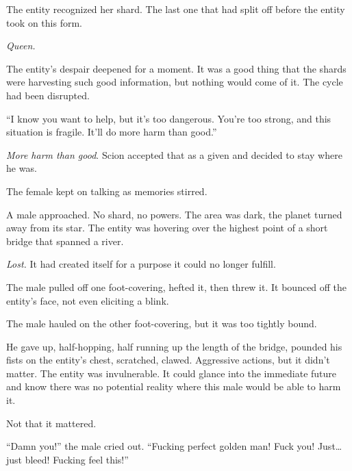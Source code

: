 The entity recognized her shard.  The last one that had split off before the entity took on this form.



\emph{Queen.}



The entity's despair deepened for a moment.  It was a good thing that the shards were harvesting such good information, but nothing would come of it.  The cycle had been disrupted.



``I know you want to help, but it's too dangerous.  You're too strong, and this situation is fragile.  It'll do more harm than good.''



\emph{More harm than good}.  Scion accepted that as a given and decided to stay where he was.



The female kept on talking as memories stirred.



\blacksquare



A male approached.  No shard, no powers.  The area was dark, the planet turned away from its star.  The entity was hovering over the highest point of a short bridge that spanned a river.



\emph{Lost.}  It had created itself for a purpose it could no longer fulfill.



The male pulled off one foot-covering, hefted it, then threw it.  It bounced off the entity's face, not even eliciting a blink.



The male hauled on the other foot-covering, but it was too tightly bound.



He gave up, half-hopping, half running up the length of the bridge, pounded his fists on the entity's chest, scratched, clawed.  Aggressive actions, but it didn't matter.  The entity was invulnerable.  It could glance into the immediate future and know there was no potential reality where this male would be able to harm it.



Not that it mattered.



``Damn you!'' the male cried out.  ``Fucking perfect golden man!  Fuck you!  Just\ldots just bleed!  Fucking feel this!''



